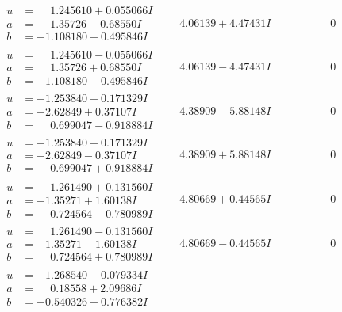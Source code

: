 \documentclass[1p]{elsarticle_modified}
\theoremstyle{definition}
\begin{document}
$$\begin{array}{c|c|c}
\begin{aligned}
u &= \phantom{-}1.245610 + 0.055066 I \\
a &= \phantom{-}1.35726 - 0.68550 I \\
b &= -1.108180 + 0.495846 I\end{aligned}
 & \phantom{-}4.06139 + 4.47431 I & \phantom{-0.000000 } 0 \\ \hline\begin{aligned}
u &= \phantom{-}1.245610 - 0.055066 I \\
a &= \phantom{-}1.35726 + 0.68550 I \\
b &= -1.108180 - 0.495846 I\end{aligned}
 & \phantom{-}4.06139 - 4.47431 I & \phantom{-0.000000 } 0 \\ \hline\begin{aligned}
u &= -1.253840 + 0.171329 I \\
a &= -2.62849 + 0.37107 I \\
b &= \phantom{-}0.699047 - 0.918884 I\end{aligned}
 & \phantom{-}4.38909 - 5.88148 I & \phantom{-0.000000 } 0 \\ \hline\begin{aligned}
u &= -1.253840 - 0.171329 I \\
a &= -2.62849 - 0.37107 I \\
b &= \phantom{-}0.699047 + 0.918884 I\end{aligned}
 & \phantom{-}4.38909 + 5.88148 I & \phantom{-0.000000 } 0 \\ \hline\begin{aligned}
u &= \phantom{-}1.261490 + 0.131560 I \\
a &= -1.35271 + 1.60138 I \\
b &= \phantom{-}0.724564 - 0.780989 I\end{aligned}
 & \phantom{-}4.80669 + 0.44565 I & \phantom{-0.000000 } 0 \\ \hline\begin{aligned}
u &= \phantom{-}1.261490 - 0.131560 I \\
a &= -1.35271 - 1.60138 I \\
b &= \phantom{-}0.724564 + 0.780989 I\end{aligned}
 & \phantom{-}4.80669 - 0.44565 I & \phantom{-0.000000 } 0 \\ \hline\begin{aligned}
u &= -1.268540 + 0.079334 I \\
a &= \phantom{-}0.18558 + 2.09686 I \\
b &= -0.540326 - 0.776382 I\end{aligned}

\end{array}$$
\end{document}
